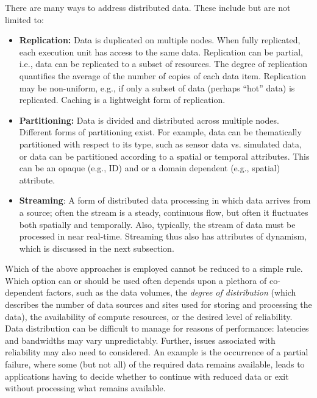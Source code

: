 There are many ways to address distributed data.  These include but
are not limited to:
\begin{itemize}
\item \textbf{Replication:} Data is duplicated on multiple nodes. When
  fully replicated, each execution unit has access to the same
  data. Replication can be partial, i.e., data can be replicated to a
  subset of resources. The degree of replication quantifies the
  average of the number of copies of each data item. Replication may
  be non-uniform, e.g., if only a subset of data (perhaps ``hot''
  data) is replicated. Caching is a lightweight form of replication.
\item \textbf{Partitioning:} Data is divided and distributed across
  multiple nodes. Different forms of partitioning exist.  For example,
  data can be thematically partitioned with respect to its type, such
  as sensor data vs. simulated data, or data can be partitioned
  according to a spatial or temporal attributes. This can be an opaque
  (e.g., ID) and or a domain dependent (e.g., spatial) attribute.
\item \textbf{Streaming}: A form of distributed data processing in
  which data arrives from a source; often the stream is a steady,
  continuous flow, but often it fluctuates both spatially and
  temporally. Also, typically, the stream of data must be processed in
  near real-time. Streaming thus also has attributes of dynamism, which is
  discussed in the next subsection.
\end{itemize}

Which of the above approaches is employed cannot be reduced to a simple
rule. Which option can or should be used often depends upon a plethora
of co-dependent factors, such as the data volumes, the {\it degree of
distribution} (which describes the number of data sources and sites used for
storing and processing the data), the availability of compute resources, or the
desired level of reliability. Data distribution can be difficult to manage for
reasons of performance: latencies and bandwidths may vary unpredictably.
Further, issues associated with reliability may also need to considered. An
example is the occurrence of a partial failure, where some (but not all) of
the required data remains available, leads to applications having to decide
whether to continue with reduced data or exit without processing what remains
available.


